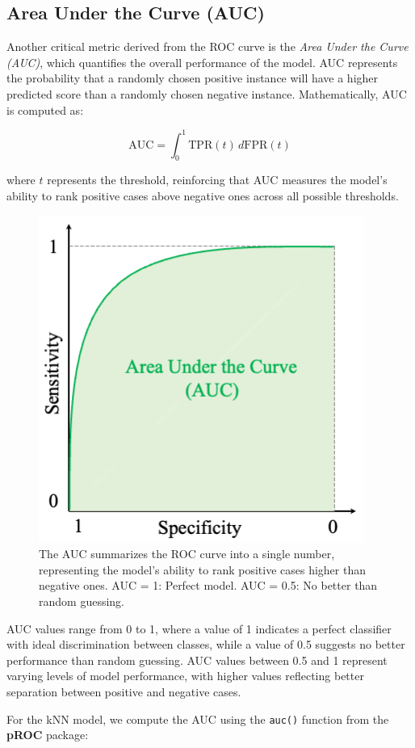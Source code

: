 \documentclass[
]{book}
\newcommand{\passthrough}[1]{#1}
\theoremstyle{definition}
\theoremstyle{definition}
\theoremstyle{definition}
\theoremstyle{definition}
\theoremstyle{remark}
\begin{document}
\subsection*{Area Under the Curve (AUC)}\label{area-under-the-curve-auc}

Another critical metric derived from the ROC curve is the \emph{Area Under the Curve (AUC)}, which quantifies the overall performance of the model. AUC represents the probability that a randomly chosen positive instance will have a higher predicted score than a randomly chosen negative instance. Mathematically, AUC is computed as:

\[
\text{AUC} = \int_{0}^{1} \text{TPR}(t) \, d\text{FPR}(t)
\]

where \(t\) represents the threshold, reinforcing that AUC measures the model's ability to rank positive cases above negative ones across all possible thresholds.

\begin{figure}

{\centering \includegraphics[width=0.45\linewidth]{images/auc} 

}

\caption{The AUC summarizes the ROC curve into a single number, representing the model’s ability to rank positive cases higher than negative ones. AUC = 1: Perfect model. AUC = 0.5: No better than random guessing.}\label{fig:auc}
\end{figure}

AUC values range from 0 to 1, where a value of 1 indicates a perfect classifier with ideal discrimination between classes, while a value of 0.5 suggests no better performance than random guessing. AUC values between 0.5 and 1 represent varying levels of model performance, with higher values reflecting better separation between positive and negative cases.

For the kNN model, we compute the AUC using the \passthrough{\lstinline!auc()!} function from the \textbf{pROC} package:
\end{document}
